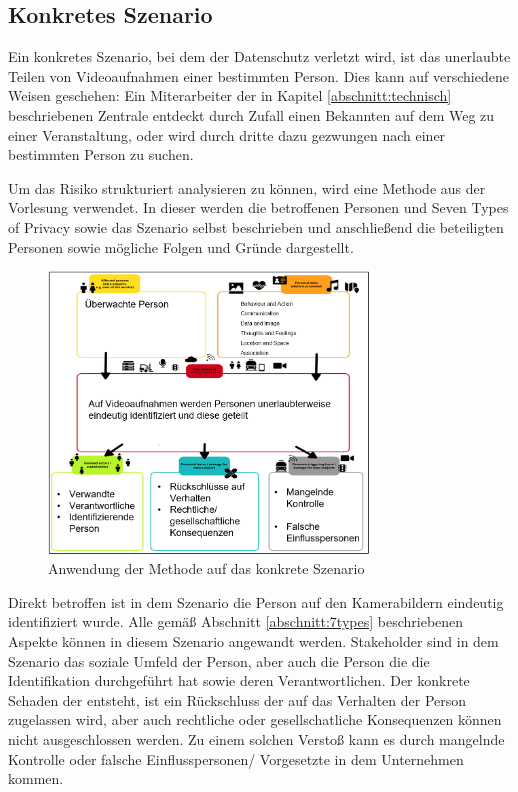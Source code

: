 \subsection{Konkretes Szenario}
\label{abschnitt:konkret}
Ein konkretes Szenario, bei dem der Datenschutz verletzt wird, ist das unerlaubte Teilen von Videoaufnahmen einer bestimmten Person. Dies kann auf verschiedene Weisen geschehen: Ein Miterarbeiter der in
Kapitel \ref{abschnitt:technisch} beschriebenen Zentrale entdeckt durch Zufall einen Bekannten auf dem Weg zu einer Veranstaltung, oder wird durch dritte dazu gezwungen nach einer bestimmten Person zu suchen.

Um das Risiko strukturiert analysieren zu können, wird eine Methode aus der Vorlesung verwendet. In dieser werden die betroffenen Personen und \glqq{}Seven Types of Privacy\grqq{} sowie das Szenario selbst beschrieben
und anschließend die beteiligten Personen sowie mögliche Folgen und Gründe dargestellt.
\begin{figure}[ht]
      \begin{center}
            \includegraphics[width= 0.76\textwidth]{Bilder/privacy.png}
            \caption{Anwendung der Methode auf das konkrete Szenario}
            \label{fig:Privacy}
      \end{center}
\end{figure}
\newline
Direkt betroffen ist in dem Szenario die Person auf den Kamerabildern eindeutig identifiziert wurde. Alle gemäß Abschnitt \ref{abschnitt:7types} beschriebenen Aspekte können in diesem Szenario angewandt werden.
Stakeholder sind in dem Szenario das soziale Umfeld der Person, aber auch die Person die die Identifikation durchgeführt hat sowie deren Verantwortlichen. Der konkrete Schaden der entsteht, ist ein Rückschluss
der auf das Verhalten der Person zugelassen wird, aber auch rechtliche oder gesellschatliche Konsequenzen können nicht ausgeschlossen werden. Zu einem solchen Verstoß kann es durch mangelnde Kontrolle oder falsche
Einflusspersonen/ Vorgesetzte in dem Unternehmen kommen.

